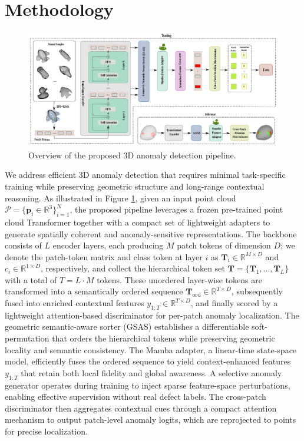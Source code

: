 \section{Methodology}

\begin{figure}[h!]
  \centering 
    \includegraphics[width=0.98\linewidth]{figs/overview}
  \caption{Overview of the proposed 3D anomaly detection pipeline.}
  \label{fig:overview}
\end{figure}

We address efficient 3D anomaly detection that requires minimal task-specific training while preserving geometric structure and long-range contextual reasoning. As illustrated in Figure \ref{fig:overview}, given an input point cloud \(\mathcal{P} = \{\mathbf{p}_i \in \mathbb{R}^3\}_{i=1}^N\), the proposed pipeline leverages a frozen pre-trained point cloud Transformer together with a compact set of lightweight adapters to generate spatially coherent and anomaly-sensitive representations. The backbone consists of \(L\) encoder layers, each producing \(M\) patch tokens of dimension \(D\); we denote the patch-token matrix and class token at layer \(i\) as \(\mathbf{T}_i \in \mathbb{R}^{M\times D}\) and \(c_i \in \mathbb{R}^{1\times D}\), respectively, and collect the hierarchical token set \(\mathbf{T} = \{\mathbf{T}_1, \dots, \mathbf{T}_L\}\) with a total of \(T = L \cdot M\) tokens. These unordered layer-wise tokens are transformed into a semantically ordered sequence \(\mathbf{T}_{\mathrm{ord}} \in \mathbb{R}^{T\times D}\), subsequently fused into enriched contextual features \(y_{1:T} \in \mathbb{R}^{T\times D}\), and finally scored by a lightweight attention-based discriminator for per-patch anomaly localization. The geometric semantic-aware sorter (GSAS) establishes a differentiable soft-permutation that orders the hierarchical tokens while preserving geometric locality and semantic consistency. The Mamba adapter, a linear-time state-space model, efficiently fuses the ordered sequence to yield context-enhanced features \(y_{1:T}\) that retain both local fidelity and global awareness. A selective anomaly generator operates during training to inject sparse feature-space perturbations, enabling effective supervision without real defect labels. The cross-patch discriminator then aggregates contextual cues through a compact attention mechanism to output patch-level anomaly logits, which are reprojected to points for precise localization. 

